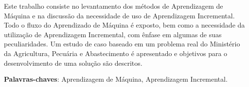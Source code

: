 \begin{resumo}
Este trabalho consiste no levantamento dos métodos de Aprendizagem de Máquina e na discussão da necessidade de uso de Aprendizagem Incremental. Todo o fluxo do Aprendizado de Máquina é exposto, bem como a necessidade da utilização de Aprendizagem Incremental, com ênfase em algumas de suas peculiaridades. Um estudo de caso baseado em um problema real do Ministério da Agricultura, Pecuária e Abastecimento é apresentado e objetivos para o desenvolvimento de uma solução são descritos.


\vspace{\onelineskip}
    
 \noindent
 \textbf{Palavras-chaves}: Aprendizagem de Máquina, Aprendizagem Incremental.

\end{resumo}
